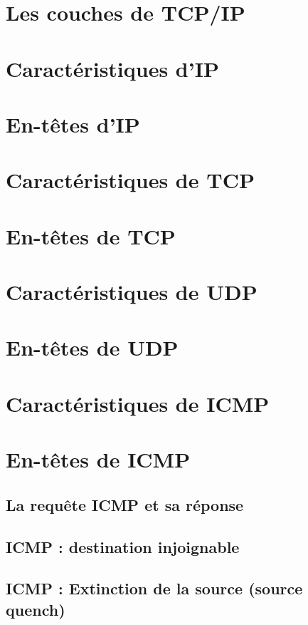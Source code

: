 \documentclass[a4paper,11pt]{report}
\begin{document}
\section{Les couches de TCP/IP} %

\section{Caractéristiques d'IP}

\section{En-têtes d'IP}

\section{Caractéristiques de TCP}

\section{En-têtes de TCP}

\section{Caractéristiques de UDP}

\section{En-têtes de UDP}

\section{Caractéristiques de ICMP}

\section{En-têtes de ICMP}

\subsection{La requête ICMP et sa réponse}

\subsection{ICMP : destination injoignable}

\subsection{ICMP : Extinction de la source (source quench)}
\end{document}
